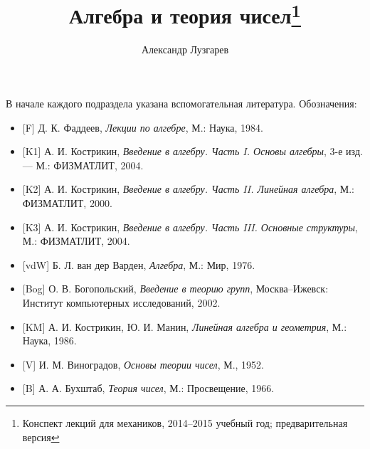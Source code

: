 \documentclass[12pt]{article}
\theoremstyle{plain}
\theoremstyle{remark}
\theoremstyle{definition}
\begin{document}
\title{Алгебра и теория чисел\footnote{Конспект
    лекций для механиков, 2014--2015 учебный год; предварительная
    версия}}
\author{Александр Лузгарев}
\date{}

\maketitle

\tableofcontents

\vfill

В начале каждого подраздела указана вспомогательная
литература. Обозначения:

\begin{itemize}
\item {}[F] Д. К. Фаддеев, {\it Лекции по алгебре}, М.: Наука, 1984.
\item {}[K1] А. И. Кострикин, {\it Введение в алгебру. Часть I. Основы
    алгебры}, 3-е изд. --- М.: ФИЗМАТЛИТ, 2004.
\item {}[K2] А. И. Кострикин, {\it Введение в алгебру. Часть II. Линейная
    алгебра}, М.: ФИЗМАТЛИТ, 2000.
\item {}[K3] А. И. Кострикин, {\it Введение в алгебру. Часть
    III. Основные структуры}, М.: ФИЗ\-МАТЛИТ, 2004.
\item {}[vdW] Б. Л. ван дер Варден, {\it Алгебра}, М.: Мир, 1976.
\item {}[Bog] О. В. Богопольский, {\it Введение в теорию групп},
  Москва--Ижевск: Институт компьютерных исследований, 2002.
\item {}[KM] А. И. Кострикин, Ю. И. Манин, {\it Линейная алгебра и
    геометрия}, М.: Наука, 1986.
\item {}[V] И. М. Виноградов, {\it Основы теории чисел}, М., 1952.
\item {}[B] А. А. Бухштаб, {\it Теория чисел}, М.: Просвещение, 1966.
\end{itemize}


\vfill\eject













\clearpage
{}

\end{document}
